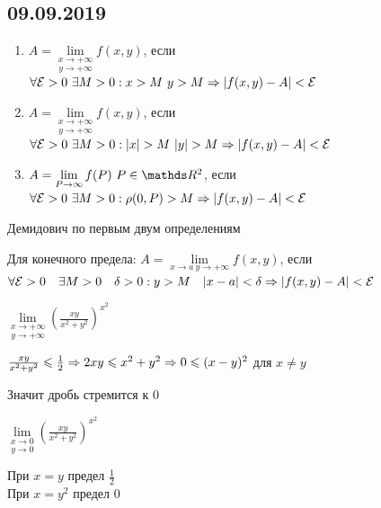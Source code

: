 \documentclass[11pt]{article}
\begin{document}
\subsection{09.09.2019}
\begin{definition}
\begin{enumerate}
        \item $A=\underset{y \rightarrow +\infty}{\lim\limits_{x \rightarrow +\infty}} f(x,y)$, если $\forall \E>0 \ \e M>0: x>M \ y>M \ra |f(x,y)-A| < \E$
        \item $A=\underset{y \rightarrow +\infty}{\lim\limits_{x \rightarrow +\infty}} f(x,y)$, если $\forall \E>0 \ \e M>0: |x|>M \ |y|>M \ra |f(x,y)-A| < \E$
        \item $A=\lim\limits_{P \rightarrow \infty} f(P) \ P \in \R^2$, если $\forall \mathcal{E}>0 \ \exists M>0: \rho(0, P)>M \Rightarrow |f(x,y)-A| < \mathcal{E}$
    \end{enumerate}
\end{definition}

\begin{comments}
    Демидович по первым двум определениям
\end{comments}

\begin{definition}
    Для конечного предела: $A=\lim\limits_{x \rightarrow a \  y \rightarrow +\infty} f(x,y)$, если $\forall \mathcal{E}>0 \quad \exists M>0 \quad \delta > 0: y>M \quad |x-a| < \delta \Rightarrow |f(x,y)-A| < \mathcal{E}$
\end{definition}

\begin{instance}
    $\underset{y \rightarrow +\infty}{\lim\limits_{x \rightarrow +\infty}} (\frac{x y}{x^2+y^2})^{x^2}$
\end{instance}

\begin{reshenie}
    
    $\frac{x y}{x^2+y^2} \leqslant \frac{1}{2} \Rightarrow 2xy \leqslant x^2 + y^2 \Rightarrow 0 \leqslant (x-y)^2$ для $x \neq y$
    
    Значит дробь стремится к 0
\end{reshenie}

\begin{instance}
    $\underset{y \rightarrow 0}{\lim\limits_{x \rightarrow 0}} (\frac{x y}{x^2+y^2})^{x^2}$
\end{instance}

\begin{reshenie}
    При $x=y$ предел $\frac{1}{2}$\\
    При $x=y^2$ предел 0
\end{reshenie}
\end{document}
